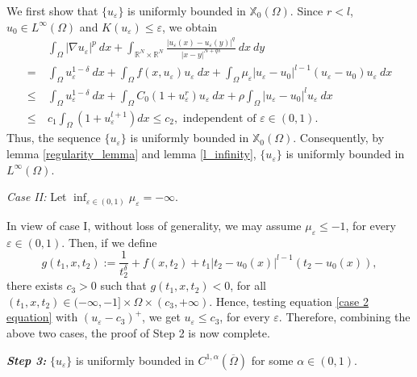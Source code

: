 \documentclass[reqno,oneside]{amsart}
\theoremstyle{definition}
\theoremstyle{remark}
\numberwithin{equation}{section}
\newcommand{\Om} {\Omega}
\newcommand{\sr}{\mathbb{R}}
\newcommand{\coa}{C^{1,\alpha}(\overline{\Om})}
\newcommand{\na} {\nabla}
\newcommand{\xo}{\mathbb{X}_0}
\begin{document}
We first show that $\{ u_{\varepsilon} \}$ is uniformly bounded in $\xo (\Om)$. Since $r<l$, $u_0 \in L^{\infty}(\Om)$ and $K(u_{\varepsilon}) \leq \varepsilon$, we obtain
\begin{equation*}
    \begin{aligned}
        &\int_{\Om} |\na u_{\varepsilon}|^p\ dx + \int_{\sr^N \times \sr^N} \frac{|u_{\varepsilon} (x) - u_{\varepsilon} (y)|^q}{|x-y|^{N+qs}}\ dx\ dy\\
        = &\int_{\Om} u_{\varepsilon}^{1-\delta}\ dx + \int_{\Om} f(x,u_{\varepsilon}) u_{\varepsilon}\ dx + \int_{\Om} \mu_{\varepsilon} |u_{\varepsilon} - u_0|^{l-1} (u_{\varepsilon} - u_0) u_{\varepsilon}\ dx\\
        \leq &\int_{\Om} u_{\varepsilon}^{1- \delta}\ dx + \int_{\Om} C_0 (1+u_{\varepsilon}^r) u_{\varepsilon}\ dx + \rho \int_{\Om} |u_{\varepsilon} - u_0|^l u_{\varepsilon}\ dx\\
        \leq\ & c_1 \int_{\Om} \left(1+ u_{\varepsilon}^{l+1} \right) dx \leq c_2, \text{ independent of } \varepsilon \in (0,1).
    \end{aligned}
\end{equation*}
Thus, the sequence $\{ u_{\varepsilon} \}$ is uniformly bounded in $\xo (\Om)$. Consequently, by lemma \ref{regularity_lemma} and lemma \ref{l_infinity}, $\{ u_{\varepsilon} \}$ is uniformly bounded in $L^{\infty} (\Om)$.
\vspace{5pt}

\noindent\textit{Case II:} Let $\displaystyle\inf_{\varepsilon \in (0,1)} \mu_{\varepsilon} = -\infty$.
\vspace{5pt}

In view of case I, without loss of generality, we may assume $\mu_{\varepsilon} \leq -1$, for every $\varepsilon \in (0,1)$. Then, if we define 
\[g(t_1,x,t_2):= \frac{1}{t_2^{\delta}} + f(x,t_2) + t_1|t_2 -u_0 (x)|^{l-1} (t_2 - u_0 (x)),\]
there exists $c_3>0$ such that $g(t_1, x, t_2)<0$, for all $(t_1,x,t_2) \in (-\infty, -1] \times \Om \times (c_3, +\infty)$. Hence, testing equation \eqref{case 2 equation} with $(u_{\varepsilon} - c_3 )^+$, we get $u_{\varepsilon} \leq c_3$, for every $\varepsilon$. Therefore, combining the above two cases, the proof of Step 2 is now complete.
\vspace{5pt}

\noindent\textit{\textbf{Step 3:}} $\{ u_{\varepsilon}\}$ is uniformly bounded in $\coa$ for some $\alpha \in (0,1)$.
\vspace{5pt}
\end{document}
